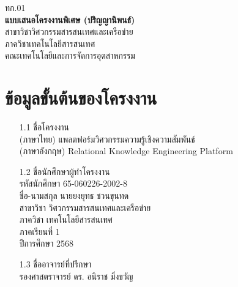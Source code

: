 \documentclass[12pt,a4paper]{article}
\newcommand{\textlight}[1]{{\thailightfont #1}}
\begin{document}
\begin{center}
\hfill\textlight{ทก.01}\\[1cm]
\large\textbf{แบบเสนอโครงงานพิเศษ (ปริญญานิพนธ์)}\\[0.3cm]
\normalsize\textlight{สาขาวิชาวิศวกรรมสารสนเทศและเครือข่าย}\\[0.1cm]
\normalsize\textlight{ภาควิชาเทคโนโลยีสารสนเทศ}\\[0.1cm]
\normalsize\textlight{คณะเทคโนโลยีและการจัดการอุตสาหกรรม}\\[0.1cm]
\end{center}

\thispagestyle{empty}
\vspace{0.5cm}

\section{ข้อมูลขั้นต้นของโครงงาน}
\begin{enumerate}[leftmargin=2cm]
\small
    \item[1.1] ชื่อโครงงาน
    \\ \textlight{(ภาษาไทย)} \hspace{0.5cm} {แพลตฟอร์มวิศวกรรมความรู้เชิงความสัมพันธ์}
    \\ \textlight{(ภาษาอังกฤษ)} \hspace{0.04cm} {Relational Knowledge Engineering Platform}

    \item[1.2] ชื่อนักศึกษาผู้ทำโครงงาน
    \\ \textlight{รหัสนักศึกษา} \hspace{0.3cm} {65-060226-2002-8}
    \\ \textlight{ชื่อ-นามสกุล} \hspace{0.4cm} {นายยงยุทธ ชวนขุนทด}
    \\ \textlight{สาขาวิชา} \hspace{0.935cm} {วิศวกรรมสารสนเทศและเครือข่าย}
    \\ \textlight{ภาควิชา} \hspace{1.12cm} {เทคโนโลยีสารสนเทศ}
    \\ \textlight{ภาคเรียนที่} \hspace{0.7cm} {1}
    \\ \textlight{ปีการศึกษา} \hspace{0.67cm} {2568}

    \item[1.3] ชื่ออาจารย์ที่ปรึกษา
    \\ {รองศาสตราจารย์ ดร. อนิราช มิ่งขวัญ}
\end{enumerate}
\end{document}

